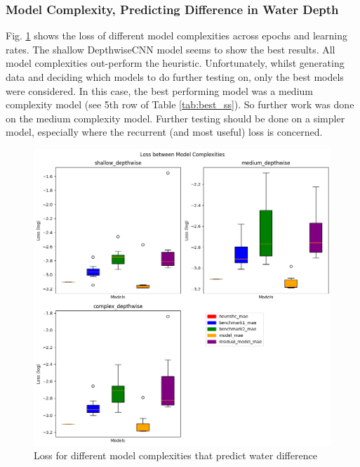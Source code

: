 \subsubsection*{Model Complexity, Predicting Difference in Water Depth}
Fig. \ref{fig:depthwise-complexity} shows the loss of different model complexities across epochs and learning rates. The shallow DepthwiseCNN model seems to show the best results. All model complexities out-perform the heuristic. Unfortunately, whilst generating data and deciding which models to do further testing on, only the best models were considered. In this case, the best performing model was a medium complexity model (see 5th row of Table \ref{tab:best_ss}). So further work was done on the medium complexity model. Further testing should be done on a simpler model, especially where the recurrent (and most useful) loss is concerned. 
\begin{figure}[tbph]
	\centering
	\includegraphics[width=0.7\linewidth, height=0.4\textheight]{Figures/Results/Diff_Complexity_Lr_Epochs/Complexity/Box_model_complexity}
	\caption[Loss Depending on Model Complexity for DepthwiseCNN]{Loss for different model complexities that predict water difference}
	\label{fig:depthwise-complexity}
\end{figure}


